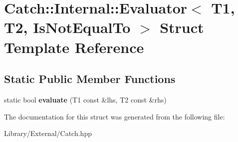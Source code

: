 \hypertarget{struct_catch_1_1_internal_1_1_evaluator_3_01_t1_00_01_t2_00_01_is_not_equal_to_01_4}{}\section{Catch\+:\+:Internal\+:\+:Evaluator$<$ T1, T2, Is\+Not\+Equal\+To $>$ Struct Template Reference}
\label{struct_catch_1_1_internal_1_1_evaluator_3_01_t1_00_01_t2_00_01_is_not_equal_to_01_4}
\subsection*{Static Public Member Functions}
\begin{DoxyCompactItemize}
\item 
\hypertarget{struct_catch_1_1_internal_1_1_evaluator_3_01_t1_00_01_t2_00_01_is_not_equal_to_01_4_a956a12d0f4a7dceb5a1ce914421ff945}{}static bool {\bfseries evaluate} (T1 const \&lhs, T2 const \&rhs)\label{struct_catch_1_1_internal_1_1_evaluator_3_01_t1_00_01_t2_00_01_is_not_equal_to_01_4_a956a12d0f4a7dceb5a1ce914421ff945}

\end{DoxyCompactItemize}


The documentation for this struct was generated from the following file\+:\begin{DoxyCompactItemize}
\item 
Library/\+External/Catch.\+hpp\end{DoxyCompactItemize}
